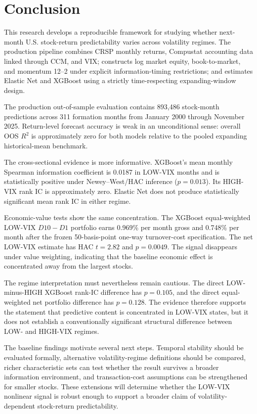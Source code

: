 \section{Conclusion}

This research develops a reproducible framework for studying whether next-month U.S. stock-return predictability varies across volatility regimes. The production pipeline combines CRSP monthly returns, Compustat accounting data linked through CCM, and VIX; constructs log market equity, book-to-market, and momentum 12--2 under explicit information-timing restrictions; and estimates Elastic Net and XGBoost using a strictly time-respecting expanding-window design.

The production out-of-sample evaluation contains 893,486 stock-month predictions across 311 formation months from January 2000 through November 2025. Return-level forecast accuracy is weak in an unconditional sense: overall OOS $R^2$ is approximately zero for both models relative to the pooled expanding historical-mean benchmark.

The cross-sectional evidence is more informative. XGBoost's mean monthly Spearman information coefficient is 0.0187 in LOW-VIX months and is statistically positive under Newey--West/HAC inference ($p=0.013$). Its HIGH-VIX rank IC is approximately zero. Elastic Net does not produce statistically significant mean rank IC in either regime.

Economic-value tests show the same concentration. The XGBoost equal-weighted LOW-VIX $D10-D1$ portfolio earns 0.969\% per month gross and 0.748\% per month after the frozen 50-basis-point one-way turnover-cost specification. The net LOW-VIX estimate has HAC $t=2.82$ and $p=0.0049$. The signal disappears under value weighting, indicating that the baseline economic effect is concentrated away from the largest stocks.

The regime interpretation must nevertheless remain cautious. The direct LOW-minus-HIGH XGBoost rank-IC difference has $p=0.105$, and the direct equal-weighted net portfolio difference has $p=0.128$. The evidence therefore supports the statement that predictive content is concentrated in LOW-VIX states, but it does not establish a conventionally significant structural difference between LOW- and HIGH-VIX regimes.

The baseline findings motivate several next steps. Temporal stability should be evaluated formally, alternative volatility-regime definitions should be compared, richer characteristic sets can test whether the result survives a broader information environment, and transaction-cost assumptions can be strengthened for smaller stocks. These extensions will determine whether the LOW-VIX nonlinear signal is robust enough to support a broader claim of volatility-dependent stock-return predictability.
